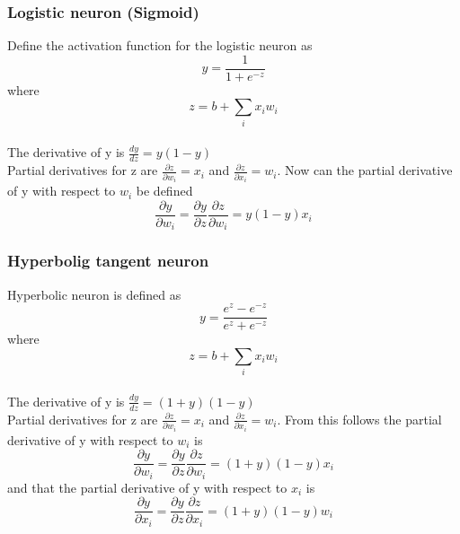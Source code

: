 \subsubsection{Logistic neuron (Sigmoid)}
Define the activation function for the logistic neuron as
\begin{equation} \label{eq:sigmoid_func}
y = \frac{1}{1+e^{-z}} 
\end{equation}  
where 
\begin{equation} \label{eq:sigmoid_func_z}
 z = b+\sum_{i}x_{i}w_{i}
\end{equation}  
\\
The derivative of y is $\frac{dy}{dz} = y(1-y)$
\\
Partial derivatives for z are $\frac{\partial{z}}{\partial{w_{i}}} = x_{i}$ and $\frac{\partial{z}}{\partial{x_{i}}} = w_{i}$. Now can the partial derivative of y with respect to $w_{i}$ be defined
\begin{equation} \label{eq:sigmoid_partial_w}
\frac{\partial{y}}{\partial{w_{i}}} =\frac{\partial{y}}{\partial{z}}\frac{\partial{z}}{\partial{w_{i}}} = y(1-y)x_{i}
\end{equation}

\subsubsection{Hyperbolig tangent neuron}
Hyperbolic neuron is defined as
\begin{equation} \label{eq:tanh_func}
y = \frac{e^{z}-e^{-z}}{e^{z}+e^{-z}}
\end{equation}
where 
\begin{equation} \label{eq:tanh_func_z}
z = b+\sum_{i}x_{i}w_{i} 
\end{equation} 
\\
The derivative of y is $\frac{dy}{dz} = (1+y)(1-y)$
\\
Partial derivatives for z are $\frac{\partial{z}}{\partial{w_{i}}} = x_{i}$ and $\frac{\partial{z}}{\partial{x_{i}}} = w_{i}$. From this follows the partial derivative of y with respect to $w_{i}$ is
\begin{equation} \label{eq:tanh_partial_w}
\frac{\partial{y}}{\partial{w_{i}}} =\frac{\partial{y}}{\partial{z}}\frac{\partial{z}}{\partial{w_{i}}} = (1+y)(1-y)x_{i}
\end{equation}
and that the partial derivative of y with respect to $x_{i}$ is
\begin{equation} \label{eq:tanh_partial_x}
\frac{\partial{y}}{\partial{x_{i}}} =\frac{\partial{y}}{\partial{z}}\frac{\partial{z}}{\partial{x_{i}}} = (1+y)(1-y)w_{i}
\end{equation}


